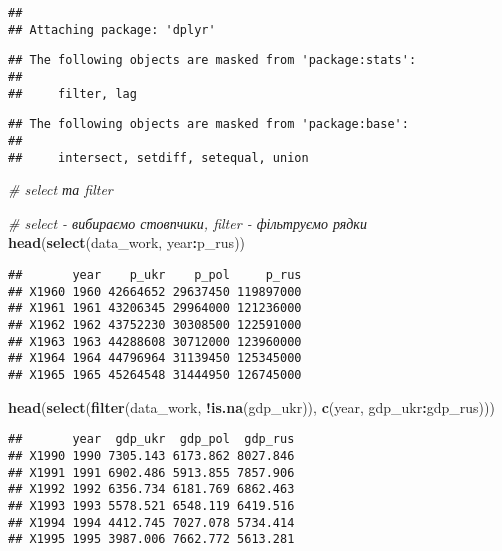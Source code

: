 \documentclass[
]{article}
\newenvironment{Shaded}{\begin{snugshade}}{\end{snugshade}}
\newcommand{\CommentTok}[1]{\textcolor[rgb]{0.56,0.35,0.01}{\textit{#1}}}
\newcommand{\KeywordTok}[1]{\textcolor[rgb]{0.13,0.29,0.53}{\textbf{#1}}}
\newcommand{\NormalTok}[1]{#1}
\newcommand{\OperatorTok}[1]{\textcolor[rgb]{0.81,0.36,0.00}{\textbf{#1}}}
\begin{document}
\begin{verbatim}
## 
## Attaching package: 'dplyr'
\end{verbatim}

\begin{verbatim}
## The following objects are masked from 'package:stats':
## 
##     filter, lag
\end{verbatim}

\begin{verbatim}
## The following objects are masked from 'package:base':
## 
##     intersect, setdiff, setequal, union
\end{verbatim}

\begin{Shaded}
\begin{Highlighting}[]
\CommentTok{# select та filter}

\CommentTok{# select - вибираємо стовпчики, filter - фільтруємо рядки}
\KeywordTok{head}\NormalTok{(}\KeywordTok{select}\NormalTok{(data_work, year}\OperatorTok{:}\NormalTok{p_rus))}
\end{Highlighting}
\end{Shaded}

\begin{verbatim}
##       year    p_ukr    p_pol     p_rus
## X1960 1960 42664652 29637450 119897000
## X1961 1961 43206345 29964000 121236000
## X1962 1962 43752230 30308500 122591000
## X1963 1963 44288608 30712000 123960000
## X1964 1964 44796964 31139450 125345000
## X1965 1965 45264548 31444950 126745000
\end{verbatim}

\begin{Shaded}
\begin{Highlighting}[]
\KeywordTok{head}\NormalTok{(}\KeywordTok{select}\NormalTok{(}\KeywordTok{filter}\NormalTok{(data_work, }\OperatorTok{!}\KeywordTok{is.na}\NormalTok{(gdp_ukr)), }\KeywordTok{c}\NormalTok{(year, gdp_ukr}\OperatorTok{:}\NormalTok{gdp_rus)))}
\end{Highlighting}
\end{Shaded}

\begin{verbatim}
##       year  gdp_ukr  gdp_pol  gdp_rus
## X1990 1990 7305.143 6173.862 8027.846
## X1991 1991 6902.486 5913.855 7857.906
## X1992 1992 6356.734 6181.769 6862.463
## X1993 1993 5578.521 6548.119 6419.516
## X1994 1994 4412.745 7027.078 5734.414
## X1995 1995 3987.006 7662.772 5613.281
\end{verbatim}
\end{document}

